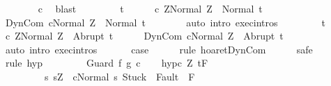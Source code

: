 \begin{isabellebody}
\ \ \ \ \ \ \isamarkupfalse%
\ c{\isacharprime}{\isacharprime}\ \isamarkupfalse%
\ blast\isanewline
\ \ \isamarkupfalse%
\isanewline
\ \ \ \ \isamarkupfalse%
\ t\isanewline
\ \ \ \ \isamarkupfalse%
\ {\isachardoublequoteopen}{\isasymGamma}{\isasymturnstile}{\isasymlangle}c\ Z{\isacharcomma}Normal\ Z{\isasymrangle}\ {\isasymRightarrow}\ Normal\ t{\isachardoublequoteclose}\isanewline
\ \ \ \ \isamarkupfalse%
\ {\isachardoublequoteopen}{\isasymGamma}{\isasymturnstile}{\isasymlangle}DynCom\ c{\isacharcomma}Normal\ Z{\isasymrangle}\ {\isasymRightarrow}\ Normal\ t{\isachardoublequoteclose}\isanewline
\ \ \ \ \ \ \isamarkupfalse%
\ {\isacharparenleft}auto\ intro{\isacharcolon}\ exec{\isachardot}intros{\isacharparenright}\isanewline
\ \ \isamarkupfalse%
\isanewline
\ \ \ \ \isamarkupfalse%
\ t\isanewline
\ \ \ \ \isamarkupfalse%
\ {\isachardoublequoteopen}{\isasymGamma}{\isasymturnstile}{\isasymlangle}c\ Z{\isacharcomma}Normal\ Z{\isasymrangle}\ {\isasymRightarrow}\ Abrupt\ t{\isachardoublequoteclose}\isanewline
\ \ \ \ \isamarkupfalse%
\ {\isachardoublequoteopen}{\isasymGamma}{\isasymturnstile}{\isasymlangle}DynCom\ c{\isacharcomma}Normal\ Z{\isasymrangle}\ {\isasymRightarrow}\ Abrupt\ t{\isachardoublequoteclose}\isanewline
\ \ \ \ \ \ \isamarkupfalse%
\ {\isacharparenleft}auto\ intro{\isacharcolon}\ exec{\isachardot}intros{\isacharparenright}\isanewline
\ \ \isamarkupfalse%
\isanewline
\ \ \isamarkupfalse%
\ {\isacharquery}case\isanewline
\ \ \ \ \isamarkupfalse%
\ {\isacharparenleft}rule\ hoaret{\isachardot}DynCom{\isacharparenright}\isanewline
\ \ \ \ \isamarkupfalse%
\ safe\isanewline
\ \ \ \ \isamarkupfalse%
\ {\isacharparenleft}rule\ hyp{\isacharprime}{\isacharparenright}\isanewline
\ \ \ \ \isamarkupfalse%
\isanewline
{}\isamarkupfalse%
\isanewline
\ \ \isamarkupfalse%
\ {\isacharparenleft}Guard\ f\ g\ c{\isacharparenright}\isanewline
\ \ \isamarkupfalse%
\ hyp{\isacharunderscore}c{\isacharcolon}\ {\isachardoublequoteopen}{\isasymforall}Z{\isachardot}\ {\isasymGamma}{\isacharcomma}{\isasymTheta}{\isasymturnstile}\isactrlsub t\isactrlbsub {\isacharslash}F\isactrlesub \ \isanewline
\ \ \ \ \ \ \ \ \ {\isacharbraceleft}s{\isachardot}\ s{\isacharequal}Z\ {\isasymand}\ {\isasymGamma}{\isasymturnstile}{\isasymlangle}c{\isacharcomma}Normal\ s{\isasymrangle}\ {\isasymRightarrow}{\isasymnotin}{\isacharparenleft}{\isacharbraceleft}Stuck{\isacharbraceright}\ {\isasymunion}\ Fault\ {\isacharbackquote}\ {\isacharparenleft}{\isacharminus}F{\isacharparenright}{\isacharparenright}\ {\isasymand}\ \isanewline

\end{isabellebody}
